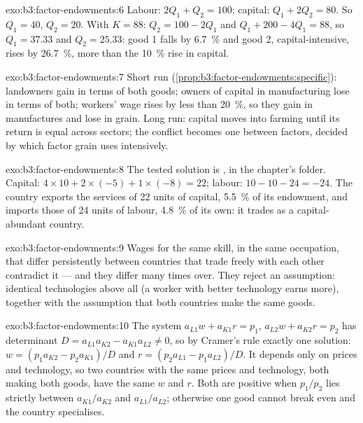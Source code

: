 \begin{solution}{exo:b3:factor-endowments:6}
Labour: $2Q_1 + Q_2 = 100$; capital: $Q_1 + 2Q_2 = 80$. So $Q_1 = 40$, $Q_2 = 20$. With $K = 88$:
$Q_2 = 100 - 2Q_1$ and $Q_1 + 200 - 4Q_1 = 88$, so $Q_1 = 37.33$ and $Q_2 = 25.33$: good 1
falls by 6.7~\% and good 2, capital-intensive, rises by 26.7~\%, more than the 10~\%
rise in capital.
\end{solution}

\begin{solution}{exo:b3:factor-endowments:7}
Short run (\cref{prop:b3:factor-endowments:specific}): landowners gain in terms
of both goods; owners of capital in manufacturing lose in terms of both; workers'
wage rises by less than 20~\%, so they gain in manufactures and lose in grain.
Long run: capital moves into farming until its return is equal across sectors;
the conflict becomes one between factors, decided by which factor grain uses
intensively.
\end{solution}

\begin{solution}{exo:b3:factor-endowments:8}
The tested solution is , in the chapter's
 folder. Capital: $4 \times 10 + 2 \times (-5) + 1 \times (-8) = 22$;
labour: $10 - 10 - 24 = -24$. %
The country exports the services of 22 units of capital, 5.5~\% of its endowment,
and imports those of 24 units of labour, 4.8~\% of its own: it trades as a
capital-abundant country.
\end{solution}

\begin{solution}{exo:b3:factor-endowments:9}
Wages for the same skill, in the same occupation, that differ persistently
between countries that trade freely with each other contradict it --- and they
differ many times over. They reject an assumption: identical technologies above
all (a worker with better technology earns more), together with the assumption
that both countries make the same goods.
\end{solution}

\begin{solution}{exo:b3:factor-endowments:10}
The system $a_{L1}w + a_{K1}r = p_1$, $a_{L2}w + a_{K2}r = p_2$ has determinant $D = a_{L1}a_{K2} -
a_{K1}a_{L2} \ne 0$, so by Cramer's rule exactly one solution: $w = (p_1a_{K2} - p_2a_{K1})/D$
and $r = (p_2a_{L1} - p_1a_{L2})/D$. It depends only on prices and technology, so two
countries with the same prices and technology, both making both goods, have the
same $w$ and $r$. Both are positive when $p_1/p_2$ lies strictly between
$a_{K1}/a_{K2}$ and $a_{L1}/a_{L2}$; otherwise one good cannot break even and the country
specialises.
\end{solution}

